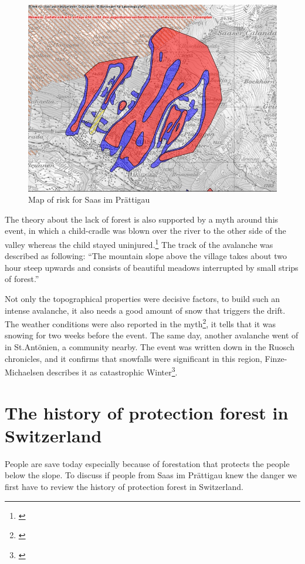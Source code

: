 \documentclass[12pt, a4paper]{article}
\begin{document}
\begin{figure}[htpb!]
\includegraphics[width=\textwidth,natwidth=610,natheight=642]{literature/gefahrenkarte.jpg}
\caption{Map of risk for Saas im Prättigau \citep{gefahrenkarte}}
\end{figure}

The theory about the lack of forest is also supported by a myth around this event, in which a child-cradle was blown over the river to the other side of the valley whereas the child stayed uninjured.\footnote{\citet[p.~53]{hansemann1995saaser}} The track of the avalanche was described as following:  ``The mountain slope above the village takes about two hour steep upwards and consists of beautiful meadows interrupted by small strips of forest.''

Not only the topographical properties were decisive factors, to build such an intense avalanche, it also needs a good amount of snow that triggers the drift. The weather conditions were also reported in the myth\footnote{\citet[p.~53]{hansemann1995saaser}}, it tells that it was snowing for two weeks before the event. The same day, another avalanche went of in St.Antönien, a community nearby. The event was written down in the Ruosch chronicles, and it confirms that snowfalls were significant in this region, Finze-Michaelsen describes it as catastrophic Winter\footnote{\citet[p.~18]{finze1988geschichte}}.  
 
\section*{The history of protection forest in Switzerland}
People are save today especially because of forestation that protects the people below the slope. To discuss if people from Saas im Prättigau knew the danger we first have to review the history of protection forest in Switzerland.
\end{document}
